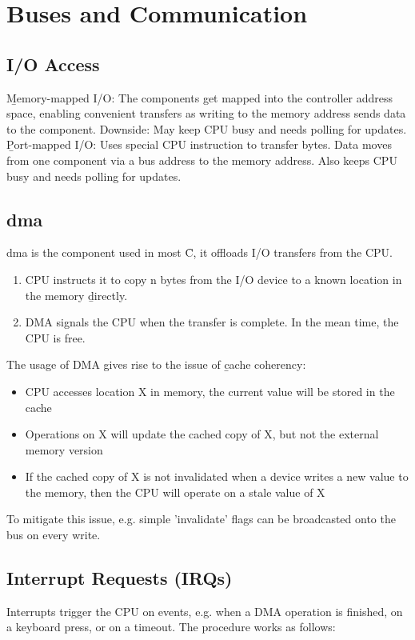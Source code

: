 \section{Buses and Communication}
\subsection{I/O Access}
\b{Memory-mapped I/O:} The components get mapped into the controller address space, enabling convenient transfers as writing to the memory address sends data to the component. Downside: May keep CPU busy and needs polling for updates.\\

\b{Port-mapped I/O:} Uses special CPU instruction to transfer bytes. Data moves from one component via a bus address to the memory address. Also keeps CPU busy and needs polling for updates.

\subsection{\ac{dma}}
\ac{dma} is the component used in most \f{\mu C}, it offloads I/O transfers from the CPU.
\begin{enumerate}
    \item CPU instructs it to copy n bytes from the I/O device to a known location in the memory \b{directly}.
    \item DMA signals the CPU when the transfer is complete. In the mean time, the CPU is free.
\end{enumerate}
\vspace*{1em}
The usage of DMA gives rise to the issue of \b{cache coherency}:
\begin{itemize}
    \item CPU accesses location X in memory, the current value will be stored in the cache
    \item Operations on X will update the cached copy of X, but not the external memory version
    \item If the cached copy of X is not invalidated when a device writes a new value to the memory, then the CPU will operate on a stale value of X
\end{itemize}
To mitigate this issue, e.g. simple 'invalidate' flags can be broadcasted onto the bus on every write.

\subsection{Interrupt Requests (IRQs)}
Interrupts trigger the CPU on events, e.g. when a DMA operation is finished, on a keyboard press, or on a timeout. The procedure works as follows:\\


